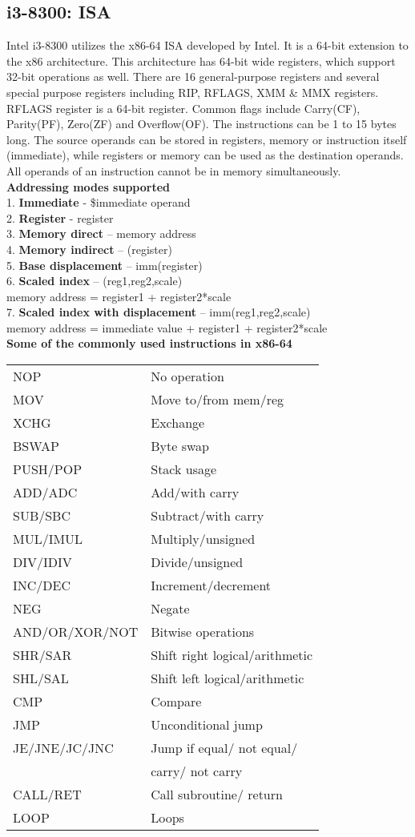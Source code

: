 \subsection{i3-8300: ISA}
Intel i3-8300 utilizes the x86-64 ISA developed by Intel. It is a 64-bit extension to the x86 architecture. This architecture has 64-bit wide registers, which support 32-bit operations as well. There are 16 general-purpose registers and several special purpose registers including RIP, RFLAGS, XMM \& MMX registers. RFLAGS register is a 64-bit register. Common flags include Carry(CF), Parity(PF), Zero(ZF) and Overflow(OF). The instructions can be 1 to 15 bytes long. The source operands can be stored in registers, memory or instruction itself (immediate), while registers or memory can be used as the destination operands. All operands of an instruction cannot be in memory simultaneously.\\
\textbf{Addressing modes supported}\\
1. \textbf{Immediate} - \$immediate operand\\
2. \textbf{Register} - register\\
3. \textbf{Memory direct} – memory address\\
4. \textbf{Memory indirect} – (register)\\
5. \textbf{Base displacement} – imm(register)\\
6. \textbf{Scaled index} – (reg1,reg2,scale)\\
memory address = register1 + register2*scale\\
7. \textbf{Scaled index with displacement} – imm(reg1,reg2,scale)\\
memory address = immediate value + register1 + register2*scale\\
\textbf{Some of the commonly used instructions in x86-64}
\begin{tabular}{l l}
NOP & No operation\\
MOV & Move to/from mem/reg\\
XCHG & Exchange\\
BSWAP & Byte swap\\
PUSH/POP & Stack usage\\
ADD/ADC & Add/with carry\\
SUB/SBC & Subtract/with carry\\
MUL/IMUL & Multiply/unsigned\\
DIV/IDIV & Divide/unsigned\\
INC/DEC & Increment/decrement\\
NEG & Negate\\
AND/OR/XOR/NOT & Bitwise operations\\
SHR/SAR & Shift right logical/arithmetic\\
SHL/SAL & Shift left logical/arithmetic\\
CMP & Compare\\
JMP & Unconditional jump\\
JE/JNE/JC/JNC & Jump if equal/ not equal/
\\&carry/ not carry\\
CALL/RET & Call subroutine/ return\\
LOOP & Loops\\
\end{tabular}
